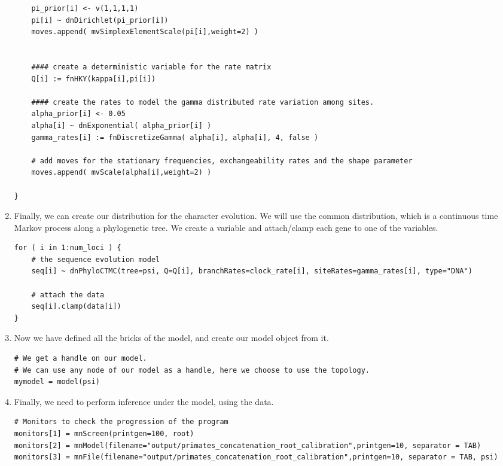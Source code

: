 \begin{enumerate}
{\begin{snugshade*}
\begin{lstlisting}
    pi_prior[i] <- v(1,1,1,1) 
    pi[i] ~ dnDirichlet(pi_prior[i])
    moves.append( mvSimplexElementScale(pi[i],weight=2) )


    #### create a deterministic variable for the rate matrix
    Q[i] := fnHKY(kappa[i],pi[i]) 

    #### create the rates to model the gamma distributed rate variation among sites.
    alpha_prior[i] <- 0.05
    alpha[i] ~ dnExponential( alpha_prior[i] )
    gamma_rates[i] := fnDiscretizeGamma( alpha[i], alpha[i], 4, false )

    # add moves for the stationary frequencies, exchangeability rates and the shape parameter
    moves.append( mvScale(alpha[i],weight=2) )

}

\end{lstlisting}
\end{snugshade*}}


\item Finally, we can create our distribution for the character evolution.
We will use the common  distribution, which is a continuous time Markov process along a phylogenetic tree.
We create a  variable and attach/clamp each gene to one of the  variables.
{\tt \begin{snugshade*}
\begin{lstlisting}
for ( i in 1:num_loci ) { 
    # the sequence evolution model
    seq[i] ~ dnPhyloCTMC(tree=psi, Q=Q[i], branchRates=clock_rate[i], siteRates=gamma_rates[i], type="DNA")

    # attach the data
    seq[i].clamp(data[i])
}
\end{lstlisting}
\end{snugshade*}}


\item Now we have defined all the bricks of the model, and create our model object from it.
{\tt \begin{snugshade*}
\begin{lstlisting}
# We get a handle on our model.
# We can use any node of our model as a handle, here we choose to use the topology.
mymodel = model(psi)
\end{lstlisting}
\end{snugshade*}}


\item Finally, we need to perform inference under the model, using the data.
{\tt \begin{snugshade*}
\begin{lstlisting}
# Monitors to check the progression of the program
monitors[1] = mnScreen(printgen=100, root)
monitors[2] = mnModel(filename="output/primates_concatenation_root_calibration",printgen=10, separator = TAB)
monitors[3] = mnFile(filename="output/primates_concatenation_root_calibration",printgen=10, separator = TAB, psi)


\end{lstlisting}
\end{snugshade*}}
\end{enumerate}
